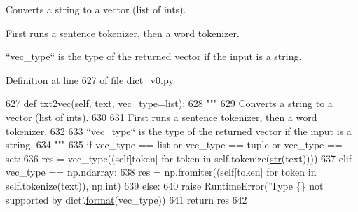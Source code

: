 \begin{DoxyVerb}Converts a string to a vector (list of ints).

First runs a sentence tokenizer, then a word tokenizer.

``vec_type`` is the type of the returned vector if the input is a string.
\end{DoxyVerb}
 

Definition at line 627 of file dict\+\_\+v0.\+py.


\begin{DoxyCode}
627     \textcolor{keyword}{def }txt2vec(self, text, vec\_type=list):
628         \textcolor{stringliteral}{"""}
629 \textcolor{stringliteral}{        Converts a string to a vector (list of ints).}
630 \textcolor{stringliteral}{}
631 \textcolor{stringliteral}{        First runs a sentence tokenizer, then a word tokenizer.}
632 \textcolor{stringliteral}{}
633 \textcolor{stringliteral}{        ``vec\_type`` is the type of the returned vector if the input is a string.}
634 \textcolor{stringliteral}{        """}
635         \textcolor{keywordflow}{if} vec\_type == list \textcolor{keywordflow}{or} vec\_type == tuple \textcolor{keywordflow}{or} vec\_type == set:
636             res = vec\_type((self[token] \textcolor{keywordflow}{for} token \textcolor{keywordflow}{in} self.tokenize(\hyperlink{namespacegenerate__task__READMEs_a5b88452ffb87b78c8c85ececebafc09f}{str}(text))))
637         \textcolor{keywordflow}{elif} vec\_type == np.ndarray:
638             res = np.fromiter((self[token] \textcolor{keywordflow}{for} token \textcolor{keywordflow}{in} self.tokenize(text)), np.int)
639         \textcolor{keywordflow}{else}:
640             \textcolor{keywordflow}{raise} RuntimeError(\textcolor{stringliteral}{'Type \{\} not supported by dict'}.\hyperlink{namespaceparlai_1_1chat__service_1_1services_1_1messenger_1_1shared__utils_a32e2e2022b824fbaf80c747160b52a76}{format}(vec\_type))
641         \textcolor{keywordflow}{return} res
642 
\end{DoxyCode}
\mbox{\label{classparlai_1_1agents_1_1legacy__agents_1_1seq2seq_1_1dict__v0_1_1DictionaryAgent_a87de974ecf69da7412e777220c29ba39}} 
